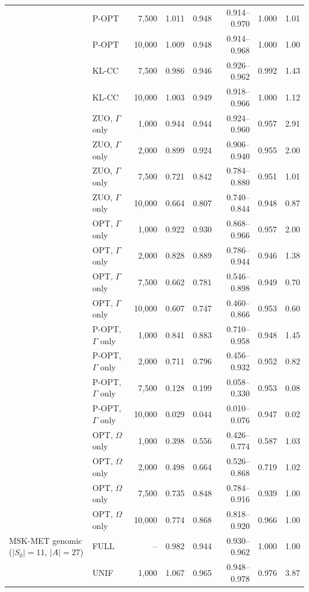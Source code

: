 \begin{tabular}{llrrrrrr}
 & P-OPT & 7,500 & 1.011 & 0.948 & 0.914--0.970 & 1.000 & 1.01\\
 & P-OPT & 10,000 & 1.009 & 0.948 & 0.914--0.968 & 1.000 & 1.00\\
 & KL-CC & 7,500 & 0.986 & 0.946 & 0.926--0.962 & 0.992 & 1.43\\
 & KL-CC & 10,000 & 1.003 & 0.949 & 0.918--0.966 & 1.000 & 1.12\\
 & ZUO, \(\Gamma\) only & 1,000 & 0.944 & 0.944 & 0.924--0.960 & 0.957 & 2.91\\
 & ZUO, \(\Gamma\) only & 2,000 & 0.899 & 0.924 & 0.906--0.940 & 0.955 & 2.00\\
 & ZUO, \(\Gamma\) only & 7,500 & 0.721 & 0.842 & 0.784--0.880 & 0.951 & 1.01\\
 & ZUO, \(\Gamma\) only & 10,000 & 0.664 & 0.807 & 0.740--0.844 & 0.948 & 0.87\\
 & OPT, \(\Gamma\) only & 1,000 & 0.922 & 0.930 & 0.868--0.966 & 0.957 & 2.00\\
 & OPT, \(\Gamma\) only & 2,000 & 0.828 & 0.889 & 0.786--0.944 & 0.946 & 1.38\\
 & OPT, \(\Gamma\) only & 7,500 & 0.662 & 0.781 & 0.546--0.898 & 0.949 & 0.70\\
 & OPT, \(\Gamma\) only & 10,000 & 0.607 & 0.747 & 0.460--0.866 & 0.953 & 0.60\\
 & P-OPT, \(\Gamma\) only & 1,000 & 0.841 & 0.883 & 0.710--0.958 & 0.948 & 1.45\\
 & P-OPT, \(\Gamma\) only & 2,000 & 0.711 & 0.796 & 0.456--0.932 & 0.952 & 0.82\\
 & P-OPT, \(\Gamma\) only & 7,500 & 0.128 & 0.199 & 0.058--0.330 & 0.953 & 0.08\\
 & P-OPT, \(\Gamma\) only & 10,000 & 0.029 & 0.044 & 0.010--0.076 & 0.947 & 0.02\\
 & OPT, \(\Omega\) only & 1,000 & 0.398 & 0.556 & 0.426--0.774 & 0.587 & 1.03\\
 & OPT, \(\Omega\) only & 2,000 & 0.498 & 0.664 & 0.526--0.868 & 0.719 & 1.02\\
 & OPT, \(\Omega\) only & 7,500 & 0.735 & 0.848 & 0.784--0.916 & 0.939 & 1.00\\
 & OPT, \(\Omega\) only & 10,000 & 0.774 & 0.868 & 0.818--0.920 & 0.966 & 1.00\\
\addlinespace
MSK-MET genomic (\(|S_0|=11\), \(|A|=27\)) & FULL & -- & 0.982 & 0.944 & 0.930--0.962 & 1.000 & 1.00\\
 & UNIF & 1,000 & 1.067 & 0.965 & 0.948--0.978 & 0.976 & 3.87\\

\end{tabular}

